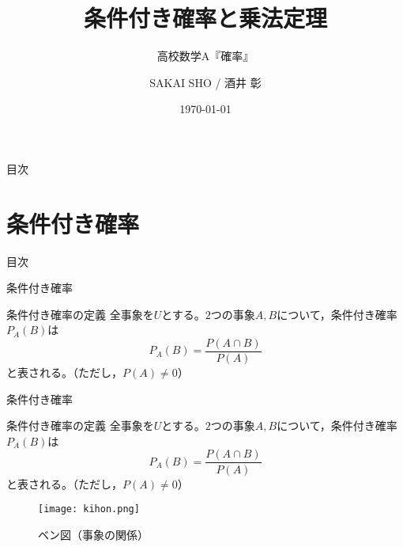 \documentclass[aspectratio=169, dvipdfmx, 11pt]{beamer}
\title{条件付き確率と乗法定理}
\subtitle{高校数学A『確率』}
\author[SAKAI SHO / 酒井 彰]{SAKAI SHO / 酒井 彰}
\institute[鹿児島大学 / 理学部]{鹿児島大学 / 理学部}
\date{\today}
\begin{document}
\maketitle


\begin{frame}{目次}
    \tableofcontents
\end{frame}


\section{条件付き確率}
\begin{frame}{目次}
    \tableofcontents[currentsection]
\end{frame}


\begin{frame}{条件付き確率}
    \begin{block}{条件付き確率の定義}
	全事象を$U$とする。$2$つの事象$A,B$について，条件付き確率$P_A(B)$は
	\begin{equation}
		P_A(B)=\frac{P(A\cap B)}{P(A)}
	\end{equation}
	と表される。（ただし，$P(A)\ne 0$）
    \end{block}
\end{frame}


\begin{frame}{条件付き確率}
    \begin{block}{条件付き確率の定義}
	全事象を$U$とする。$2$つの事象$A,B$について，条件付き確率$P_A(B)$は
	\begin{equation}
		P_A(B)=\frac{P(A\cap B)}{P(A)}
	\end{equation}
	と表される。（ただし，$P(A)\ne 0$）
    \end{block}

\begin{figure}[H]
  \begin{center}
    \texttt{[image: kihon.png]}
    \caption{ベン図（事象の関係）}
    \label{fig:graph5}
  \end{center}
\end{figure}

\end{frame}
\end{document}
